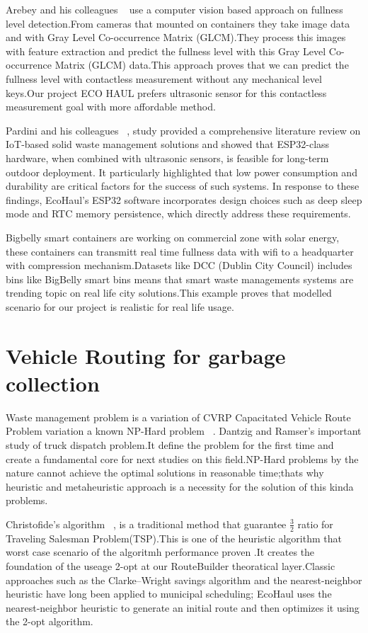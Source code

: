 \documentclass[12pt,a4paper]{report}
\begin{document}
\indent Arebey and his colleagues ~\cite{gutierrez2015} use a computer vision based approach on fullness level detection.From cameras that mounted on containers they take image data and with Gray Level Co-occurrence Matrix (GLCM).They process this images with feature extraction and predict the fullness level with this Gray Level Co-occurrence Matrix (GLCM) data.This approach proves that we can predict the fullness level with contactless  measurement without any mechanical level keys.Our project ECO HAUL prefers ultrasonic sensor for this contactless  measurement goal with more affordable method.


\indent Pardini and his colleagues ~\cite{pardini2018}, study provided a comprehensive literature review on IoT-based solid waste management solutions and showed that ESP32-class hardware, when combined with ultrasonic sensors, is feasible for long-term outdoor deployment. It particularly highlighted that low power consumption and durability are critical factors for the success of such systems. In response to these findings, EcoHaul’s ESP32 software incorporates design choices such as deep sleep mode and RTC memory persistence, which directly address these requirements.

\indent Bigbelly smart containers are working on commercial zone with solar energy, these containers can transmitt real time fullness data with wifi to a headquarter with compression mechanism.Datasets like DCC (Dublin City Council) includes bins like BigBelly smart bins means that smart waste managements systems are trending topic on real life city solutions.This example proves that modelled scenario for our project is realistic for real life usage.

\section{Vehicle Routing for garbage collection}

\indent Waste management problem is a variation of CVRP Capacitated Vehicle Route Problem variation a known NP-Hard problem ~\cite{dantzig1959}. Dantzig and Ramser's important study of truck dispatch problem.It define the problem for the first time and create a fundamental core for next studies on this field.NP-Hard problems by the nature cannot achieve the optimal solutions in reasonable time;thats why heuristic and metaheuristic approach is a necessity for the solution of this kinda problems.


\indent Christofide's algorithm ~\cite{christofides1976}, is a traditional method that guarantee $\frac{3}{2}$ ratio for Traveling Salesman Problem(TSP).This is one of the heuristic algorithm that worst case scenario of the algoritmh performance proven .It creates the foundation of the useage 2-opt at our RouteBuilder  theoratical layer.Classic approaches such as the Clarke–Wright savings algorithm and the nearest-neighbor heuristic have long been applied to municipal scheduling; EcoHaul uses the nearest-neighbor heuristic to generate an initial route and then optimizes it using the 2-opt algorithm.
\end{document}

